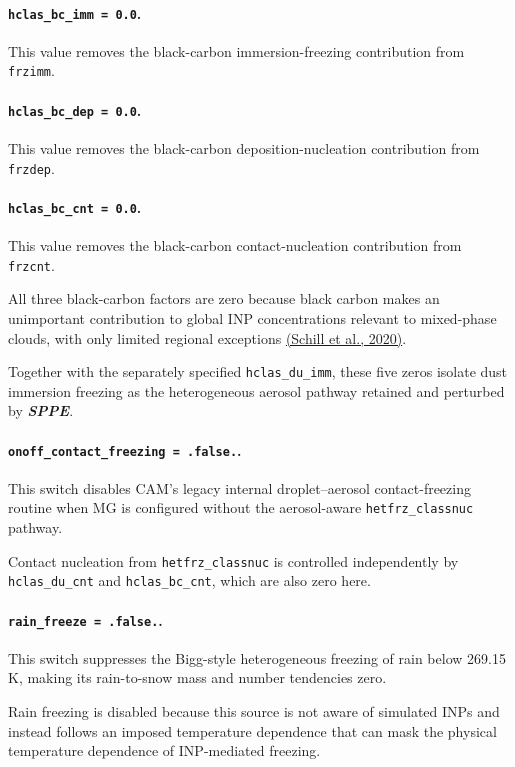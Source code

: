 \paragraph*{\texttt{hclas\_bc\_imm = 0.0}.}
This value removes the black-carbon immersion-freezing contribution from \texttt{frzimm}.

\paragraph*{\texttt{hclas\_bc\_dep = 0.0}.}
This value removes the black-carbon deposition-nucleation contribution from \texttt{frzdep}.

\paragraph*{\texttt{hclas\_bc\_cnt = 0.0}.}
This value removes the black-carbon contact-nucleation contribution from \texttt{frzcnt}.

All three black-carbon factors are zero because black carbon makes an unimportant contribution to global INP concentrations relevant to mixed-phase clouds, with only limited regional exceptions \href{https://doi.org/10.1073/pnas.2001674117}{(Schill et al., 2020)}.

Together with the separately specified \texttt{hclas\_du\_imm}, these five zeros isolate dust immersion freezing as the heterogeneous aerosol pathway retained and perturbed by \textbf{\textit{SPPE}}.

\paragraph*{\texttt{onoff\_contact\_freezing = .false.}.}
This switch disables CAM's legacy internal droplet--aerosol contact-freezing routine when MG is configured without the aerosol-aware \texttt{hetfrz\_classnuc} pathway.

Contact nucleation from \texttt{hetfrz\_classnuc} is controlled independently by \texttt{hclas\_du\_cnt} and \texttt{hclas\_bc\_cnt}, which are also zero here.

\paragraph*{\texttt{rain\_freeze = .false.}.}
This switch suppresses the Bigg-style heterogeneous freezing of rain below 269.15\,K, making its rain-to-snow mass and number tendencies zero.

Rain freezing is disabled because this source is not aware of simulated INPs and instead follows an imposed temperature dependence that can mask the physical temperature dependence of INP-mediated freezing.


